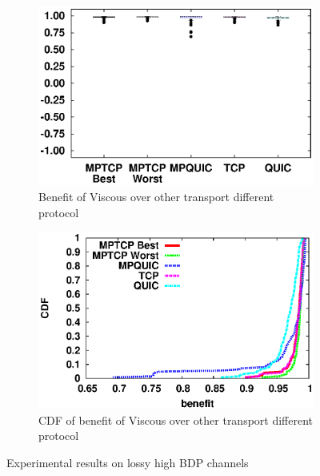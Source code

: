 \begin{figure}
	\captionsetup[subfigure]{}
	\begin{center}
		\begin{subfigure}{.49\linewidth}
			\includegraphics[width=.95\linewidth]{img/highbdp-lossy/highbdplossy_benefit.eps}
		 \caption{\label{fig:benefit-box-high-lossy} Benefit of Viscous over other transport different protocol}
		\end{subfigure}
		\begin{subfigure}{.49\linewidth}
			\includegraphics[width=.95\linewidth]{img/highbdp-lossy/highbdplossy_cdf.eps}
		 \caption{\label{fig:benefit-cdf-high-lossy} CDF of benefit of Viscous over other transport different protocol}
		\end{subfigure}
		\caption{\label{fig:benefit-high-lossy}Experimental results on lossy high BDP channels}
	\end{center}
\end{figure}



